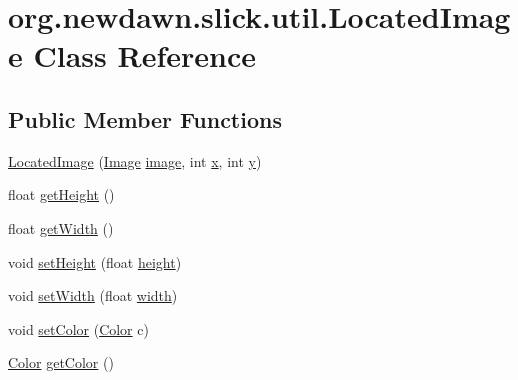\hypertarget{classorg_1_1newdawn_1_1slick_1_1util_1_1_located_image}{}\section{org.\+newdawn.\+slick.\+util.\+Located\+Image Class Reference}
\label{classorg_1_1newdawn_1_1slick_1_1util_1_1_located_image}
\subsection*{Public Member Functions}
\begin{DoxyCompactItemize}
\item 
\mbox{\hyperlink{classorg_1_1newdawn_1_1slick_1_1util_1_1_located_image_af4e33b7eef34b8a0ca57be14ee3dd121}{Located\+Image}} (\mbox{\hyperlink{classorg_1_1newdawn_1_1slick_1_1_image}{Image}} \mbox{\hyperlink{classorg_1_1newdawn_1_1slick_1_1util_1_1_located_image_ae55a57f9bf3ae27fd5d755723fb07af6}{image}}, int \mbox{\hyperlink{classorg_1_1newdawn_1_1slick_1_1util_1_1_located_image_a232edc0d0afe15fab0fc849dd163f94c}{x}}, int \mbox{\hyperlink{classorg_1_1newdawn_1_1slick_1_1util_1_1_located_image_ad6f8eeb5d7712227a3b3eeaad97c8d85}{y}})
\item 
float \mbox{\hyperlink{classorg_1_1newdawn_1_1slick_1_1util_1_1_located_image_af9547eaa28907c4ad5826d45d5a4ecb3}{get\+Height}} ()
\item 
float \mbox{\hyperlink{classorg_1_1newdawn_1_1slick_1_1util_1_1_located_image_af2573c7797bcc21b244c85923bad388d}{get\+Width}} ()
\item 
void \mbox{\hyperlink{classorg_1_1newdawn_1_1slick_1_1util_1_1_located_image_a7901ef9c83e4f9f8af194267d3be8f12}{set\+Height}} (float \mbox{\hyperlink{classorg_1_1newdawn_1_1slick_1_1util_1_1_located_image_abeb19801d483aa7fdd249c15c535edaf}{height}})
\item 
void \mbox{\hyperlink{classorg_1_1newdawn_1_1slick_1_1util_1_1_located_image_a82d5cbd11861271e437677a62e9ed143}{set\+Width}} (float \mbox{\hyperlink{classorg_1_1newdawn_1_1slick_1_1util_1_1_located_image_a26063411818a274d3ce90c93185e44ac}{width}})
\item 
void \mbox{\hyperlink{classorg_1_1newdawn_1_1slick_1_1util_1_1_located_image_a4a4f8ac6cf9c21df8ae2d2becb06d3a5}{set\+Color}} (\mbox{\hyperlink{classorg_1_1newdawn_1_1slick_1_1_color}{Color}} c)
\item 
\mbox{\hyperlink{classorg_1_1newdawn_1_1slick_1_1_color}{Color}} \mbox{\hyperlink{classorg_1_1newdawn_1_1slick_1_1util_1_1_located_image_aab6433753e44988f0ccaafc39d4f5f1b}{get\+Color}} ()

\end{DoxyCompactItemize}
